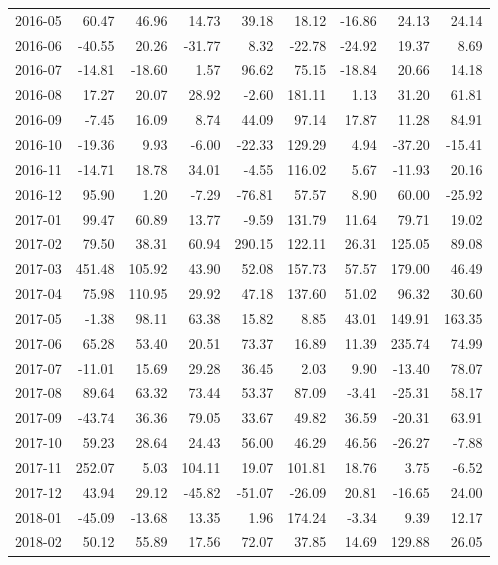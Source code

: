 \begin{table}[ht]
\begin{tabular}{lrrrrrrrr}
  2016-05 & 60.47 & 46.96 & 14.73 & 39.18 & 18.12 & -16.86 & 24.13 & 24.14 \\ 
  2016-06 & -40.55 & 20.26 & -31.77 & 8.32 & -22.78 & -24.92 & 19.37 & 8.69 \\ 
  2016-07 & -14.81 & -18.60 & 1.57 & 96.62 & 75.15 & -18.84 & 20.66 & 14.18 \\ 
  2016-08 & 17.27 & 20.07 & 28.92 & -2.60 & 181.11 & 1.13 & 31.20 & 61.81 \\ 
  2016-09 & -7.45 & 16.09 & 8.74 & 44.09 & 97.14 & 17.87 & 11.28 & 84.91 \\ 
  2016-10 & -19.36 & 9.93 & -6.00 & -22.33 & 129.29 & 4.94 & -37.20 & -15.41 \\ 
  2016-11 & -14.71 & 18.78 & 34.01 & -4.55 & 116.02 & 5.67 & -11.93 & 20.16 \\ 
  2016-12 & 95.90 & 1.20 & -7.29 & -76.81 & 57.57 & 8.90 & 60.00 & -25.92 \\ 
  2017-01 & 99.47 & 60.89 & 13.77 & -9.59 & 131.79 & 11.64 & 79.71 & 19.02 \\ 
  2017-02 & 79.50 & 38.31 & 60.94 & 290.15 & 122.11 & 26.31 & 125.05 & 89.08 \\ 
  2017-03 & 451.48 & 105.92 & 43.90 & 52.08 & 157.73 & 57.57 & 179.00 & 46.49 \\ 
  2017-04 & 75.98 & 110.95 & 29.92 & 47.18 & 137.60 & 51.02 & 96.32 & 30.60 \\ 
  2017-05 & -1.38 & 98.11 & 63.38 & 15.82 & 8.85 & 43.01 & 149.91 & 163.35 \\ 
  2017-06 & 65.28 & 53.40 & 20.51 & 73.37 & 16.89 & 11.39 & 235.74 & 74.99 \\ 
  2017-07 & -11.01 & 15.69 & 29.28 & 36.45 & 2.03 & 9.90 & -13.40 & 78.07 \\ 
  2017-08 & 89.64 & 63.32 & 73.44 & 53.37 & 87.09 & -3.41 & -25.31 & 58.17 \\ 
  2017-09 & -43.74 & 36.36 & 79.05 & 33.67 & 49.82 & 36.59 & -20.31 & 63.91 \\ 
  2017-10 & 59.23 & 28.64 & 24.43 & 56.00 & 46.29 & 46.56 & -26.27 & -7.88 \\ 
  2017-11 & 252.07 & 5.03 & 104.11 & 19.07 & 101.81 & 18.76 & 3.75 & -6.52 \\ 
  2017-12 & 43.94 & 29.12 & -45.82 & -51.07 & -26.09 & 20.81 & -16.65 & 24.00 \\ 
  2018-01 & -45.09 & -13.68 & 13.35 & 1.96 & 174.24 & -3.34 & 9.39 & 12.17 \\ 
  2018-02 & 50.12 & 55.89 & 17.56 & 72.07 & 37.85 & 14.69 & 129.88 & 26.05 \\ 

\end{tabular}
\end{table}

